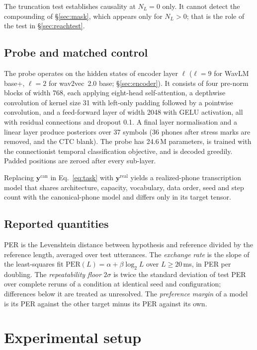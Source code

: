 \documentclass[preprint,12pt,authoryear]{elsarticle}
\begin{document}
The truncation test establishes causality at $N_L=0$ only. It cannot detect
the compounding of \S\ref{sec:mask}, which appears only for $N_L>0$; that is
the role of the test in \S\ref{sec:reachtest}.

\subsection{Probe and matched control}
\label{sec:probe}

The probe operates on the hidden states of encoder layer $\ell$ ($\ell=9$ for
WavLM base+, $\ell=2$ for wav2vec~2.0 base; \S\ref{sec:encoder}). It consists
of four pre-norm blocks of width 768, each applying eight-head self-attention,
a depthwise convolution of kernel size 31 with left-only padding followed by a
pointwise convolution, and a feed-forward layer of width 2048 with GELU
activation, all with residual connections and dropout 0.1. A final layer
normalisation and a linear layer produce posteriors over 37 symbols (36 phones
after stress marks are removed, and the CTC blank). The probe has 24.6\,M
parameters, is trained with the connectionist temporal classification
objective, and is decoded greedily. Padded positions are zeroed after every
sub-layer.

Replacing $\mathbf{y}^{\mathrm{can}}$ in Eq.~\ref{eq:task} with
$\mathbf{y}^{\mathrm{real}}$ yields a realized-phone transcription model that
shares architecture, capacity, vocabulary, data order, seed and step count
with the canonical-phone model and differs only in its target tensor.

\subsection{Reported quantities}
\label{sec:quantities}

PER is the Levenshtein distance between hypothesis and reference divided by
the reference length, averaged over test utterances. The \emph{exchange rate}
is the slope of the least-squares fit
$\mathrm{PER}(L)=\alpha+\beta\log_2 L$ over $L\ge20$\,ms, in PER per doubling.
The \emph{repeatability floor} $2\sigma$ is twice the standard deviation of
test PER over complete reruns of a condition at identical seed and
configuration; differences below it are treated as unresolved. The
\emph{preference margin} of a model is its PER against the other target minus
its PER against its own.

\section{Experimental setup}
\label{sec:setup}
\end{document}
